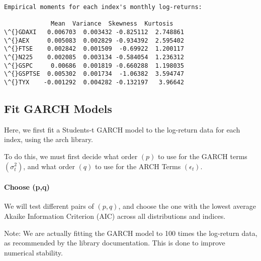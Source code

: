 \documentclass[11pt]{article}
\begin{document}
    \begin{Verbatim}[commandchars=\\\{\}]
Empirical moments for each index's monthly log-returns:

             Mean  Variance  Skewness  Kurtosis
\^{}GDAXI   0.006703  0.003432 -0.825112  2.748861
\^{}AEX     0.005083  0.002829 -0.934392  2.595402
\^{}FTSE    0.002842  0.001509  -0.69922  1.200117
\^{}N225    0.002085  0.003134 -0.584054  1.236312
\^{}GSPC     0.00686  0.001819 -0.660288  1.198035
\^{}GSPTSE  0.005302  0.001734  -1.06382  3.594747
\^{}TYX    -0.001292  0.004282 -0.132197   3.96642
    \end{Verbatim}

    \subsection{Fit GARCH Models}\label{fit-garch-models}

Here, we first fit a Students-t GARCH model to the log-return data for
each index, using the arch library.

To do this, we must first decide what order \((p)\) to use for the GARCH
terms \((\sigma^2_t)\), and what order \((q)\) to use for the ARCH Terms
\((\epsilon_t)\).

    \paragraph{Choose (p,q)}\label{choose-pq}

We will test different pairs of \((p,q)\), and choose the one with the
lowest average Akaike Information Criterion (AIC) across all
distributions and indices.

Note: We are actually fitting the GARCH model to 100 times the
log-return data, as recommended by the library documentation. This is
done to improve numerical stability.
\end{document}
